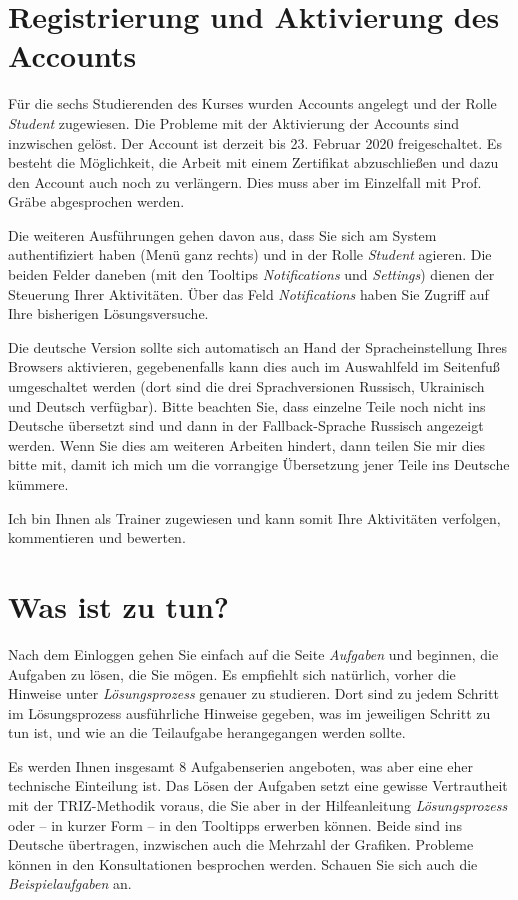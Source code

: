 \documentclass[11pt,a4paper]{article}
\begin{document}
\section{Registrierung und Aktivierung des Accounts}

Für die sechs Studierenden des Kurses wurden Accounts angelegt und der Rolle
\emph{Student} zugewiesen.  Die Probleme mit der Aktivierung der Accounts sind
inzwischen gelöst. Der Account ist derzeit bis 23. Februar 2020
freigeschaltet.  Es besteht die Möglichkeit, die Arbeit mit einem Zertifikat
abzuschließen und dazu den Account auch noch zu verlängern. Dies muss aber im
Einzelfall mit Prof. Gräbe abgesprochen werden.

Die weiteren Ausführungen gehen davon aus, dass Sie sich am System
authentifiziert haben (Menü ganz rechts) und in der Rolle \emph{Student}
agieren.  Die beiden Felder daneben (mit den Tooltips \emph{Notifications} und
\emph{Settings}) dienen der Steuerung Ihrer Aktivitäten. Über das Feld
\emph{Notifications} haben Sie Zugriff auf Ihre bisherigen Lösungsversuche.

Die deutsche Version sollte sich automatisch an Hand der Spracheinstellung
Ihres Browsers aktivieren, gegebenenfalls kann dies auch im Auswahlfeld im
Seitenfuß umgeschaltet werden (dort sind die drei Sprachversionen Russisch,
Ukrainisch und Deutsch verfügbar).  Bitte beachten Sie, dass einzelne Teile
noch nicht ins Deutsche übersetzt sind und dann in der Fallback-Sprache
Russisch angezeigt werden. Wenn Sie dies am weiteren Arbeiten hindert, dann
teilen Sie mir dies bitte mit, damit ich mich um die vorrangige Übersetzung
jener Teile ins Deutsche kümmere.

Ich bin Ihnen als Trainer zugewiesen und kann somit Ihre Aktivitäten
verfolgen, kommentieren und bewerten.

\section{Was ist zu tun?}

Nach dem Einloggen gehen Sie einfach auf die Seite \emph{Aufgaben} und
beginnen, die Aufgaben zu lösen, die Sie mögen.  Es empfiehlt sich natürlich,
vorher die Hinweise unter \emph{Lösungsprozess} genauer zu studieren.  Dort
sind zu jedem Schritt im Lösungsprozess ausführliche Hinweise gegeben, was im
jeweiligen Schritt zu tun ist, und wie an die Teilaufgabe herangegangen werden
sollte. 

Es werden Ihnen insgesamt 8 Aufgabenserien angeboten, was aber eine eher
technische Einteilung ist.  Das Lösen der Aufgaben setzt eine gewisse
Vertrautheit mit der TRIZ-Methodik voraus, die Sie aber in der Hilfeanleitung
\emph{Lösungsprozess} oder -- in kurzer Form -- in den Tooltipps erwerben
können.  Beide sind ins Deutsche übertragen, inzwischen auch die Mehrzahl der
Grafiken. Probleme können in den Konsultationen besprochen werden.  Schauen
Sie sich auch die \emph{Beispielaufgaben} an.
\end{document}

